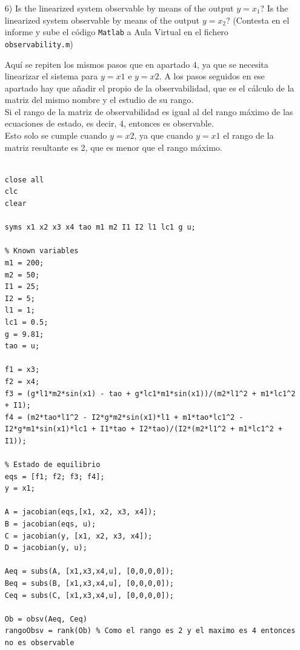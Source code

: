 \documentclass{article}
\begin{document}
\begin{itemize}
\begin{tcolorbox}[width=12cm, title={File \texttt{controllability.m}}]
\begin{scriptsize}
\begin{verbatim}
\end{verbatim}
\end{scriptsize}
\end{tcolorbox}

\item[6)]  {\color{gray} Is the linearized system observable by means of the output $y=x_1$? Is the linearized system observable by means of the output $y = x_2$? (Contesta en el informe y sube el c\'odigo \texttt{Matlab} a Aula Virtual en el fichero \texttt{observability.m})}

\bigskip

Aquí se repiten los mismos pasos que en apartado 4, ya que se necesita linearizar el sistema para $y=x{1}$ e $y=x{2}$. A los pasos seguidos en ese apartado hay que añadir el propio de la observabilidad, que es el cálculo de la matriz del mismo nombre y el estudio de su rango.\\
Si el rango de la matriz de observabilidad es igual al del rango máximo de las ecuaciones de estado, es decir, 4, entonces es observable.\\
Esto solo se cumple cuando $y=x{2}$, ya que cuando $y=x{1}$ el rango de la matriz resultante es 2, que es menor que el rango máximo.

\bigskip

\begin{tcolorbox}[width=12cm, title={File \texttt{observability.m}}]
\begin{scriptsize}
\begin{verbatim}

close all
clc
clear

syms x1 x2 x3 x4 tao m1 m2 I1 I2 l1 lc1 g u;

% Known variables
m1 = 200;
m2 = 50;
I1 = 25;
I2 = 5;
l1 = 1;
lc1 = 0.5;
g = 9.81;
tao = u;

f1 = x3;
f2 = x4;
f3 = (g*l1*m2*sin(x1) - tao + g*lc1*m1*sin(x1))/(m2*l1^2 + m1*lc1^2 + I1);
f4 = (m2*tao*l1^2 - I2*g*m2*sin(x1)*l1 + m1*tao*lc1^2 - I2*g*m1*sin(x1)*lc1 + I1*tao + I2*tao)/(I2*(m2*l1^2 + m1*lc1^2 + I1));

% Estado de equilibrio
eqs = [f1; f2; f3; f4];
y = x1;

A = jacobian(eqs,[x1, x2, x3, x4]);
B = jacobian(eqs, u);
C = jacobian(y, [x1, x2, x3, x4]);
D = jacobian(y, u);

Aeq = subs(A, [x1,x3,x4,u], [0,0,0,0]);
Beq = subs(B, [x1,x3,x4,u], [0,0,0,0]);
Ceq = subs(C, [x1,x3,x4,u], [0,0,0,0]);

Ob = obsv(Aeq, Ceq)
rangoObsv = rank(Ob) % Como el rango es 2 y el maximo es 4 entonces no es observable


\end{verbatim}
\end{scriptsize}
\end{tcolorbox}
\end{itemize}
\end{document}
